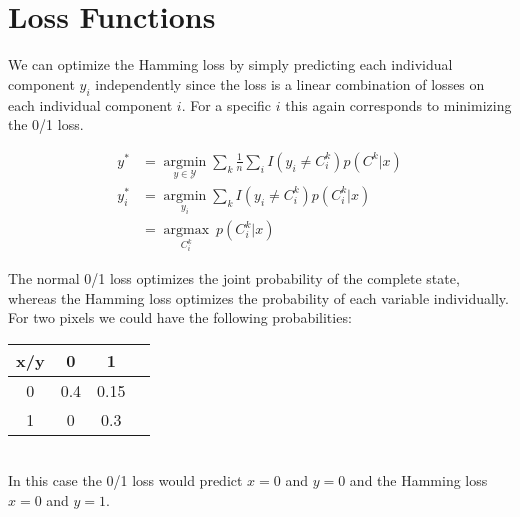 \section*{Loss Functions} %
\label{sec:loss_functions}
We can optimize the Hamming loss by simply predicting each individual component $y_i$ independently since the loss is a linear combination of losses on each individual component $i$. For a specific $i$ this again corresponds to minimizing the 0/1 loss.

\begin{align}
	y^* &= \underset{y \in \mathcal{Y}}{\operatorname{argmin}} \sum_k \frac{1}{n} \sum_i I(y_i \neq C_i^k) p(C^k|x) \\
	y_i^* &= \underset{y_i}{\operatorname{argmin}} \sum_k I(y_i \neq C_i^k) p(C_i^k|x) \\
	&= \underset{C_i^k}{\operatorname{argmax}} ~ p(C_i^k|x)
\end{align}

The normal 0/1 loss optimizes the joint probability of the complete state, whereas the Hamming loss optimizes the probability of each variable individually. For two pixels we could have the following probabilities:

\begin{tabular}{c|c|c|c}
	x/y & 0   & 1    \\ \hline
	0	& 0.4 & 0.15  \\ \hline
	1	& 0   & 0.3    \\ 
\end{tabular}\\

In this case the 0/1 loss would predict $x=0$ and $y=0$ and the Hamming loss $x = 0$ and $y=1$.

